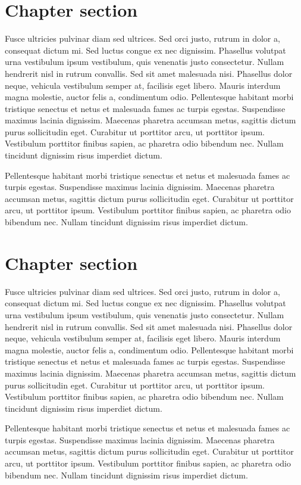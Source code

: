 \section{Chapter section}
Fusce ultricies pulvinar diam sed ultrices. Sed orci justo, rutrum in dolor a, consequat dictum mi. Sed luctus congue ex nec dignissim. Phasellus volutpat urna vestibulum ipsum vestibulum, quis venenatis justo consectetur. Nullam hendrerit nisl in rutrum convallis. Sed sit amet malesuada nisi. Phasellus dolor neque, vehicula vestibulum semper at, facilisis eget libero. Mauris interdum magna molestie, auctor felis a, condimentum odio. Pellentesque habitant morbi tristique senectus et netus et malesuada fames ac turpis egestas. Suspendisse maximus lacinia dignissim. Maecenas pharetra accumsan metus, sagittis dictum purus sollicitudin eget. Curabitur ut porttitor arcu, ut porttitor ipsum. Vestibulum porttitor finibus sapien, ac pharetra odio bibendum nec. Nullam tincidunt dignissim risus imperdiet dictum.

Pellentesque habitant morbi tristique senectus et netus et malesuada fames ac turpis egestas. Suspendisse maximus lacinia dignissim. Maecenas pharetra accumsan metus, sagittis dictum purus sollicitudin eget. Curabitur ut porttitor arcu, ut porttitor ipsum. Vestibulum porttitor finibus sapien, ac pharetra odio bibendum nec. Nullam tincidunt dignissim risus imperdiet dictum.

\section{Chapter section}
Fusce ultricies pulvinar diam sed ultrices. Sed orci justo, rutrum in dolor a, consequat dictum mi. Sed luctus congue ex nec dignissim. Phasellus volutpat urna vestibulum ipsum vestibulum, quis venenatis justo consectetur. Nullam hendrerit nisl in rutrum convallis. Sed sit amet malesuada nisi. Phasellus dolor neque, vehicula vestibulum semper at, facilisis eget libero. Mauris interdum magna molestie, auctor felis a, condimentum odio. Pellentesque habitant morbi tristique senectus et netus et malesuada fames ac turpis egestas. Suspendisse maximus lacinia dignissim. Maecenas pharetra accumsan metus, sagittis dictum purus sollicitudin eget. Curabitur ut porttitor arcu, ut porttitor ipsum. Vestibulum porttitor finibus sapien, ac pharetra odio bibendum nec. Nullam tincidunt dignissim risus imperdiet dictum.

Pellentesque habitant morbi tristique senectus et netus et malesuada fames ac turpis egestas. Suspendisse maximus lacinia dignissim. Maecenas pharetra accumsan metus, sagittis dictum purus sollicitudin eget. Curabitur ut porttitor arcu, ut porttitor ipsum. Vestibulum porttitor finibus sapien, ac pharetra odio bibendum nec. Nullam tincidunt dignissim risus imperdiet dictum.

